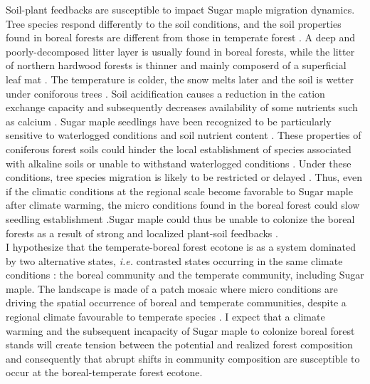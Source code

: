 Soil-plant feedbacks are susceptible to impact Sugar maple migration dynamics.
Tree species respond differently to the soil conditions, and the soil
properties found in boreal forests are different from those in temperate
forest \cite{Lafleur2010,Barras1998,Goldblum2010,Demers1998}. A deep and
poorly-decomposed litter layer is usually found in boreal forests, while the
litter of  northern hardwood forests is thinner and mainly composerd of a
superficial leaf mat \cite{Barras1998}. The temperature is colder, the snow
melts later and the soil is wetter under coniforous trees
\cite{Lafleur2010,Goldblum2010}. Soil acidification causes a reduction in the
cation exchange capacity and subsequently decreases availability of some
nutrients such as calcium \cite{Moore2008}. Sugar maple seedlings have been
recognized to be particularly sensitive to waterlogged conditions and soil
nutrient content \cite{Moore2008,Lafleur2010,Cleavitt2011}. These properties
of coniferous forest soils could hinder the local establishment of species
associated with alkaline soils or unable to withstand waterlogged conditions
\cite{Lafleur2010}. Under these conditions, tree species migration is likely
to be restricted or delayed \cite{Lafleur2010}. Thus, even if the climatic
conditions at the regional scale become favorable to Sugar maple after climate
warming, the micro conditions found in the boreal forest could slow seedling
establishment \cite{Kellman2004,Moore2008,Barras1998,Messier2011}.Sugar maple
could thus be unable to colonize the boreal forests as a result of strong and
localized plant-soil feedbacks \cite{McCarthyNeumann2012}.\\

I hypothesize that the temperate-boreal forest ecotone is as a system
dominated by two alternative states, \textit{i.e.} contrasted states occurring
in the same climate conditions \cite{scheffer2009critical}: the boreal
community and the temperate community, including Sugar maple. The landscape is
made of a patch mosaic where micro conditions are driving the spatial
occurrence of boreal and temperate communities, despite a regional climate
favourable to temperate species \cite{Goldblum2010,Fisichelli2013}. I expect
that a climate warming and the subsequent incapacity of Sugar maple to
colonize boreal forest stands will create  tension between the potential and
realized forest composition and consequently that abrupt shifts in community
composition are susceptible to occur at the boreal-temperate forest ecotone.\\

